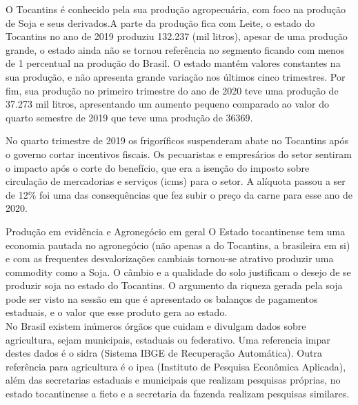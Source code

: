 \par O Tocantins é conhecido pela sua produção agropecuária, com foco na produção de Soja e seus derivados.A parte da produção fica com Leite, o estado do Tocantins no ano de 2019 produziu 132.237 (mil litros), apesar de uma produção grande, o estado ainda não se tornou referência no segmento ficando com menos de 1 percentual na produção do Brasil. O estado mantém valores constantes na sua produção, e não apresenta grande variação nos últimos cinco trimestres. Por fim, sua produção no primeiro trimestre do ano de 2020 teve uma produção de 37.273 mil litros, apresentando um aumento pequeno comparado ao valor do quarto semestre de 2019 que teve uma produção de 36369.



\par No quarto trimestre de 2019 os frigoríficos suspenderam abate no Tocantins após o governo cortar incentivos fiscais. Os pecuaristas e empresários do setor sentiram o impacto após o corte do benefício, que era a isenção do imposto sobre circulação de mercadorias e serviços (\acrshort{icms}) para o setor. A alíquota passou a ser de 12\% foi uma das consequências que fez subir o preço da carne para esse ano de 2020.

\begin{smbox}[label={labelbox},nameref={Agricultura}]{Produção em evidência e Agronegócio em geral}
	O Estado tocantinense tem uma economia pautada no agronegócio (não apenas a do Tocantins, a brasileira em si) e com as frequentes desvalorizações cambiais tornou-se atrativo produzir uma commodity como a Soja. O câmbio e a qualidade do solo justificam o desejo de se produzir soja no  estado do Tocantins. O argumento da riqueza gerada pela soja pode ser visto na sessão em que é apresentado os balanços de pagamentos estaduais, e o valor que esse produto gera ao estado.
\\
	No Brasil existem inúmeros órgãos que cuidam e divulgam dados sobre agricultura, sejam municipais, estaduais ou federativo. Uma referencia impar destes dados é o \acrshort{sidra} (Sistema IBGE de Recuperação Automática). Outra referência para agricultura é o \acrshort{ipea} (Instituto de Pesquisa Econômica Aplicada), além das secretarias estaduais e municipais que realizam pesquisas próprias, no estado tocantinense a \acrshort{fieto} e a secretaria da fazenda realizam pesquisas similares.
\end{smbox}

